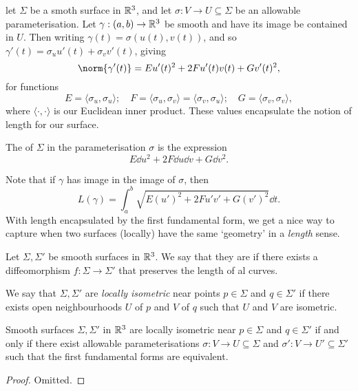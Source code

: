 \documentclass[a4paper, 10pt, twocolumn]{amsart}
\begin{document}
let $\Sigma$ be a smoth surface in $\mathbb{R}^3$, and let $\sigma: V \rightarrow U \subseteq \Sigma$ be an allowable parameterisation. Let $\gamma: (a, b) \rightarrow \mathbb{R}^3$ be smooth and have its image be contained in $U$. Then writing $\gamma(t) = \sigma(u(t), v(t))$, and so $\gamma'(t) = \sigma_u u'(t) + \sigma_v v'(t)$, giving
$$
\norm{\gamma'(t)} = E u'(t)^2 + 2F u'(t) v(t) + Gv'(t)^2,
$$
for functions
$$
E = \langle \sigma_u, \sigma_u\rangle; \quad F = \langle \sigma_u, \sigma_v \rangle = \langle \sigma_v, \sigma_u \rangle; \quad G = \langle \sigma_v, \sigma_v \rangle,
$$
where $\langle \cdot, \cdot \rangle$ is our Euclidean inner product. These values encapsulate the notion of length for our surface.

\begin{definition}
    The  of $\Sigma$ in the parameterisation $\sigma$ is the expression
    $$
    E \dd u^2 + 2F \dd u \dd v + G \dd v^2.
    $$
\end{definition}

Note that if $\gamma$ has image in the image of $\sigma$, then
$$
L(\gamma) = \int_a^b \sqrt{E (u')^2 + 2F u' v' + G(v')^2} \dd t.
$$
With length encapsulated by the first fundamental form, we get a nice way to capture when two surfaces (locally) have the same `geometry' in a \emph{length} sense.

\begin{definition}[Isometric]
    Let $\Sigma, \Sigma'$ be smooth surfaces in $\mathbb{R}^3$. We say that they are  if there exists a diffeomorphism $f: \Sigma \rightarrow \Sigma'$ that preserves the length of al curves.
\end{definition}
\begin{definition}
    We say that $\Sigma, \Sigma'$ are \emph{locally isometric} near points $p \in \Sigma$ and $q \in \Sigma'$ if there exists open neighbourhoods $U$ of $p$ and $V$ of $q$ such that $U$ and $V$ are isometric.
\end{definition}
\begin{lemma}
    Smooth surfaces $\Sigma, \Sigma'$ in $\mathbb{R}^3$ are locally isometric near $p \in \Sigma$ and $q \in \Sigma'$ if and only if there exist allowable parameterisations $\sigma: V \rightarrow U \subseteq \Sigma$ and $\sigma': V \rightarrow U' \subseteq \Sigma'$ such that the first fundamental forms are equivalent. 
\end{lemma}
\begin{proof}
    Omitted.
\end{proof}
\end{document}
